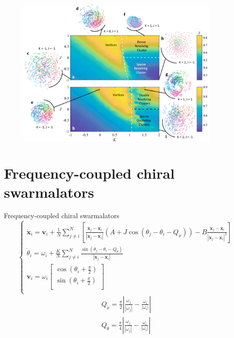 \documentclass[10pt,aspectratio=43,mathserif,table]{beamer}
\begin{document}
\begin{frame}
    \begin{figure}
        \centering
        \includegraphics[width=0.9\textwidth]{fig4.png}
    \end{figure}
\end{frame}

\section{Frequency-coupled chiral swarmalators}

\begin{frame}{Frequency-coupled chiral swarmalators}
    $$
    \begin{cases}
        \dot{\mathbf{x}}_i=\mathbf{v}_i+\frac{1}{N}\sum_{j\ne i}^N{\left[ \frac{\mathbf{x}_j-\mathbf{x}_i}{\left| \mathbf{x}_j-\mathbf{x}_i \right|}\left( A+J\cos \left( \theta _j-\theta _i-Q_{\dot{x}} \right) \right) -B\frac{\mathbf{x}_j-\mathbf{x}_i}{\left| \mathbf{x}_j-\mathbf{x}_i \right|^2} \right]}\\
        \dot{\theta}_i=\omega _i+\frac{K}{N}\sum_{j\ne i}^N{\frac{\sin \left( \theta _j-\theta _i-Q_{\dot{\theta}} \right)}{\left| \mathbf{x}_j-\mathbf{x}_i \right|}}\\
        \mathbf{v}_i=\omega _i\left[ \begin{array}{c}
        \cos \left( \theta _i+\frac{\pi}{2} \right)\\
        \sin \left( \theta _i+\frac{\pi}{2} \right)\\
    \end{array} \right]\\
    \end{cases}
    $$
    $$
    \begin{array}{c}
        Q_{\dot{x}}=\frac{\pi}{2}\left| \frac{\omega _j}{\left| \omega _j \right|}-\frac{\omega _i}{\left| \omega _i \right|} \right|\\
        Q_{\dot{\theta}}=\frac{\pi}{4}\left| \frac{\omega _j}{\left| \omega _j \right|}-\frac{\omega _i}{\left| \omega _i \right|} \right|\\
    \end{array}
    $$
\end{frame}
\end{document}

